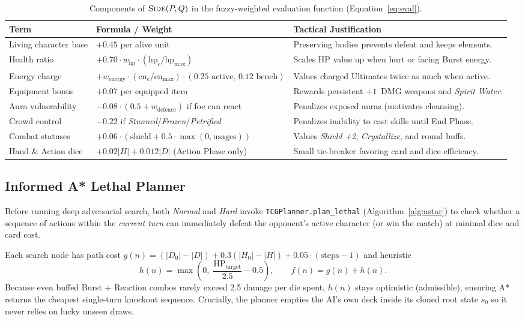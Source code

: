 \documentclass[11pt,a4paper]{article}
\newcommand{\fn}[1]{\textsc{#1}}
\begin{document}
\begin{table}[H]
\centering
\caption{Components of $\fn{Side}(P, Q)$ in the fuzzy-weighted evaluation function (Equation~\ref{eq:eval}).}
\label{tab:eval-weights}
\small
\begin{tabularx}{\textwidth}{@{}L{3.2cm} L{6.2cm} Y@{}}
\toprule
Term & Formula / Weight & Tactical Justification \\
\midrule
Living character base & $+0.45$ per alive unit & Preserving bodies prevents defeat and keeps elements. \\
Health ratio & $+0.70 \cdot w_{\text{hp}} \cdot (\text{hp}_c / \text{hp}_{\max})$ & Scales HP value up when hurt or facing Burst energy. \\
Energy charge & $+w_{\text{energy}} \cdot (\text{en}_c / \text{en}_{\max}) \cdot (0.25 \text{ active},\, 0.12 \text{ bench})$ & Values charged Ultimates twice as much when active. \\
Equipment bonus & $+0.07$ per equipped item & Rewards persistent $+1$~DMG weapons and \emph{Spirit Water}. \\
Aura vulnerability & $-0.08 \cdot (0.5 + w_{\text{defence}})$ if foe can react & Penalizes exposed auras (motivates cleansing). \\
Crowd control & $-0.22$ if \emph{Stunned}/\emph{Frozen}/\emph{Petrified} & Penalizes inability to cast skills until End Phase. \\
Combat statuses & $+0.06 \cdot (\text{shield} + 0.5 \cdot \max(0,\text{usages}))$ & Values \emph{Shield +2}, \emph{Crystallize}, and round buffs. \\
Hand \& Action dice & $+0.02 |H| + 0.012 |D|$ (Action Phase only) & Small tie-breaker favoring card and dice efficiency. \\
\bottomrule
\end{tabularx}
\end{table}

\subsection{Informed A* Lethal Planner}

Before running deep adversarial search, both \emph{Normal} and \emph{Hard} invoke \texttt{TCGPlanner.plan\_lethal} (Algorithm~\ref{alg:astar}) to check whether a sequence of actions within the \emph{current turn} can immediately defeat the opponent's active character (or win the match) at minimal dice and card cost.

Each search node has path cost $g(n) = (|D_0| - |D|) + 0.3(|H_0| - |H|) + 0.05 \cdot (\text{steps}-1)$ and heuristic
\begin{equation}
  h(n) = \max\!\left(0,\; \frac{\text{HP}_{\text{target}}}{2.5} - 0.5\right), \qquad f(n) = g(n) + h(n).
  \label{eq:astar-h}
\end{equation}
Because even buffed Burst + Reaction combos rarely exceed 2.5 damage per die spent, $h(n)$ stays optimistic (admissible), ensuring A* returns the cheapest single-turn knockout sequence. Crucially, the planner empties the AI's own deck inside its cloned root state $s_0$ so it never relies on lucky unseen draws.
\end{document}
